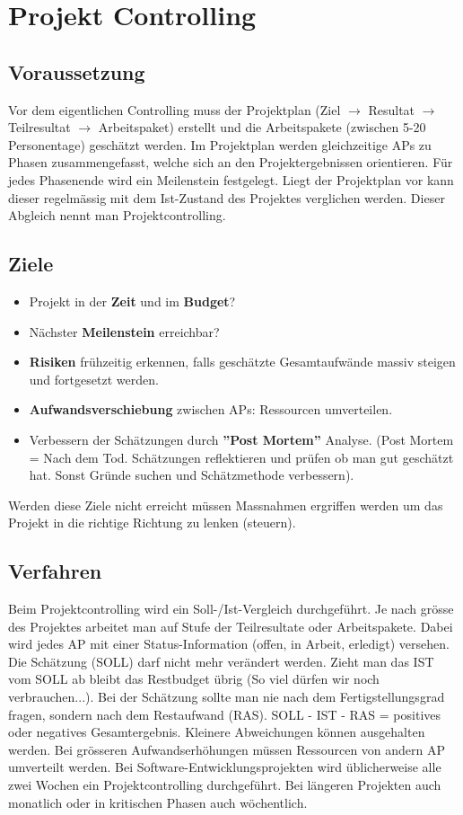 \chapter{Projekt Controlling}

\section{Voraussetzung}
Vor dem eigentlichen Controlling muss der Projektplan (Ziel $\rightarrow$ Resultat $\rightarrow$ Teilresultat $\rightarrow$ Arbeitspaket) erstellt und die Arbeitspakete (zwischen 5-20 Personentage) geschätzt werden. Im Projektplan werden gleichzeitige APs zu Phasen zusammengefasst, welche sich an den Projektergebnissen orientieren. Für jedes Phasenende wird ein Meilenstein festgelegt. 
Liegt der Projektplan vor kann dieser regelmässig mit dem Ist-Zustand des Projektes verglichen werden. Dieser Abgleich nennt man Projektcontrolling. 

\section{Ziele}
\begin{itemize}
	\item Projekt in der \textbf{Zeit} und im \textbf{Budget}?
	\item Nächster \textbf{Meilenstein} erreichbar?
	\item \textbf{Risiken} frühzeitig erkennen, falls geschätzte Gesamtaufwände massiv steigen und fortgesetzt werden.
	\item \textbf{Aufwandsverschiebung} zwischen APs: Ressourcen umverteilen.
	\item Verbessern der Schätzungen durch \textbf{''Post Mortem''} Analyse. (Post Mortem = Nach dem Tod. Schätzungen reflektieren und prüfen ob man gut geschätzt hat. Sonst Gründe suchen und Schätzmethode verbessern).
\end{itemize}
Werden diese Ziele nicht erreicht müssen Massnahmen ergriffen werden um das Projekt in die richtige Richtung zu lenken (steuern).

\section{Verfahren}
Beim Projektcontrolling wird ein Soll-/Ist-Vergleich durchgeführt. Je nach grösse des Projektes arbeitet man auf Stufe der Teilresultate oder Arbeitspakete. Dabei wird jedes AP mit einer Status-Information (offen, in Arbeit, erledigt) versehen. Die Schätzung (SOLL) darf nicht mehr verändert werden. Zieht man das IST vom SOLL ab bleibt das Restbudget übrig (So viel dürfen wir noch verbrauchen...). Bei der Schätzung sollte man nie nach dem Fertigstellungsgrad fragen, sondern nach dem Restaufwand (RAS). SOLL - IST - RAS = positives oder negatives Gesamtergebnis. Kleinere Abweichungen können ausgehalten werden. Bei grösseren Aufwandserhöhungen müssen Ressourcen von andern AP umverteilt werden. Bei Software-Entwicklungsprojekten wird üblicherweise alle zwei Wochen ein Projektcontrolling durchgeführt. Bei längeren Projekten auch monatlich oder in kritischen Phasen auch wöchentlich.


